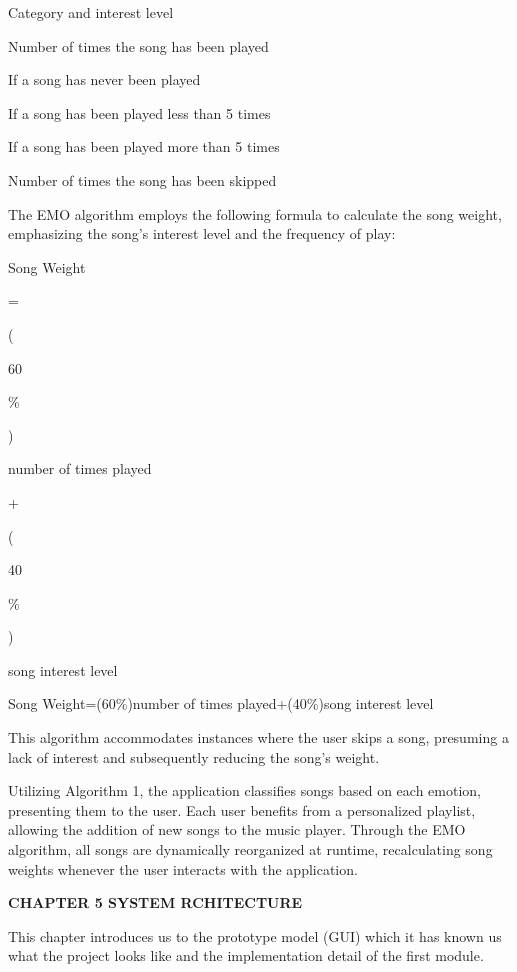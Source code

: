\documentclass[a4paper]{article}
\begin{document}
Category and interest level

Number of times the song has been played

If a song has never been played

If a song has been played less than 5 times

If a song has been played more than 5 times

Number of times the song has been skipped

The EMO algorithm employs the following formula to calculate the song weight, emphasizing the song's interest level and
the frequency of play:

Song Weight

=

(

60

\%

)

{\texttimes}

number of times played

+

(

40

\%

)

{\texttimes}

song interest level

Song Weight=(60\%){\texttimes}number of times played+(40\%){\texttimes}song interest level


\bigskip

This algorithm accommodates instances where the user skips a song, presuming a lack of interest and subsequently
reducing the song's weight.

Utilizing Algorithm 1, the application classifies songs based on each emotion, presenting them to the user. Each user
benefits from a personalized playlist, allowing the addition of new songs to the music player. Through the EMO
algorithm, all songs are dynamically reorganized at runtime, recalculating song weights whenever the user interacts
with the application.\textbf{ }

\clearpage\setcounter{page}{1}\pagestyle{Convertedx}
{\bfseries
\hypertarget{3j2qqm3}{}CHAPTER 5 SYSTEM RCHITECTURE}

This chapter introduces us to the prototype model (GUI) which it has known us what the project looks like and the
implementation detail of the first module. 
\end{document}
